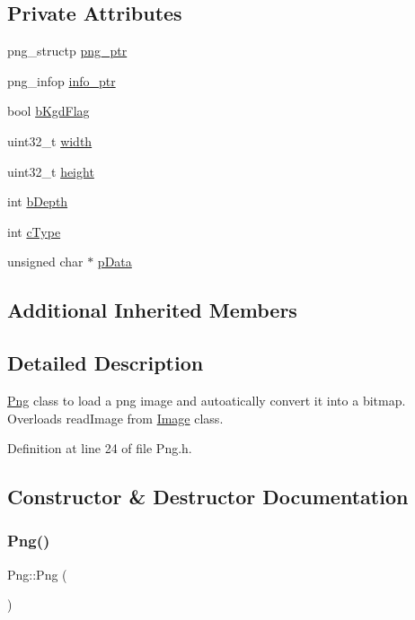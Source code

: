 \subsection*{Private Attributes}
\begin{DoxyCompactItemize}
\item 
png\+\_\+structp \mbox{\hyperlink{classPng_acbf8ea4c3185452d8620432e5fbd3e38}{png\+\_\+ptr}}
\item 
png\+\_\+infop \mbox{\hyperlink{classPng_a33d2aad2ce8332b520bab0842ba7d5d9}{info\+\_\+ptr}}
\item 
bool \mbox{\hyperlink{classPng_ae40f44717df30fac8de85a5c9fa429d6}{b\+Kgd\+Flag}}
\item 
uint32\+\_\+t \mbox{\hyperlink{classPng_a30b6c073e17f2f0cde3eca9e31036f3c}{width}}
\item 
uint32\+\_\+t \mbox{\hyperlink{classPng_a46412756311804d40e8e8bf62633e40f}{height}}
\item 
int \mbox{\hyperlink{classPng_a96907d5307f3d79f20c5daaea24c84fa}{b\+Depth}}
\item 
int \mbox{\hyperlink{classPng_ae8acde4e85d5da0271325abfabb8a24c}{c\+Type}}
\item 
unsigned char $\ast$ \mbox{\hyperlink{classPng_a7d98b75596a172d31599b3e1102210ab}{p\+Data}}
\end{DoxyCompactItemize}
\subsection*{Additional Inherited Members}


\subsection{Detailed Description}
\mbox{\hyperlink{classPng}{Png}} class to load a png image and autoatically convert it into a bitmap. Overloads read\+Image from \mbox{\hyperlink{classImage}{Image}} class. 

Definition at line 24 of file Png.\+h.



\subsection{Constructor \& Destructor Documentation}
\mbox{\label{classPng_a1b526fc595b9f38850e1b93e5bb40301}} 
\subsubsection{\texorpdfstring{Png()}{Png()}\hspace{0.1cm}{\footnotesize\ttfamily [1/3]}}
{\footnotesize\ttfamily Png\+::\+Png (\begin{DoxyParamCaption}{ }\end{DoxyParamCaption})}



